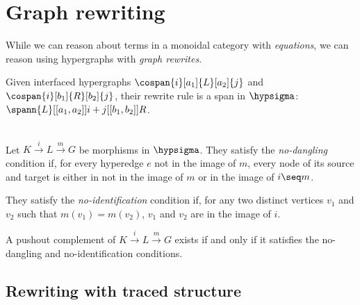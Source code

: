 \section{Graph rewriting}

While we can reason about terms in a monoidal category with \emph{equations},
we can reason using hypergraphs with \emph{graph rewrites}.

\begin{definition}
    Given interfaced hypergraphs \(
        \cospan{i}[a_1]{L}[a_2]{j}
    \) and \(
        \cospan{i}[b_1]{R}[b_2]{j}
    \), their rewrite rule is a span in \(\hypsigma\): \(
        \spann{L}[[a_1,a_2]]{i+j}[[b_1,b_2]]{R}
    \).
\end{definition}

\begin{definition}[DPO]\label{def:dpo}
    \begin{gather}
        \label{gath:dpo}
        
    \end{gather}
\end{definition}

\begin{definition}
    Let \(K \xrightarrow{i} L \xrightarrow{m} G\) be morphisms in \(\hypsigma\).
    They satisfy the \emph{no-dangling} condition if, for every hyperedge \(e\)
    not in the image of \(m\), every node of its source and target is either in
    not in the image of \(m\) or in the image of \(i \seq m\).

    They satisfy the \emph{no-identification} condition if, for any two distinct
    vertices \(v_1\) and \(v_2\) such that \(m(v_1) = m(v_2)\), \(v_1\) and
    \(v_2\) are in the image of \(i\).
\end{definition}

\begin{proposition}
    \label{prop:pushout-complement}
    A pushout complement of \(K \xrightarrow{i} L \xrightarrow{m} G\) exists
    if and only if it satisfies the no-dangling and no-identification
    conditions.
\end{proposition}

\subsection{Rewriting with traced structure}


